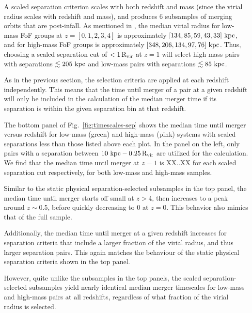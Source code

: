 \documentclass[twocolumn,linenumbers]{aastex631}
\newcommand{\Rvir}{\ensuremath{\rm R_{vir}}}
\newcommand{\chambe}{\citet{Chamberlain2024}}
\begin{document}
A scaled separation criterion scales with both redshift and mass (since the virial radius scales with redshift and mass), and produces 6 subsamples of merging orbits that are post-infall.
As mentioned in \chambe{}, the median virial radius for low-mass FoF groups at $z=[0,1,2,3,4]$ is approximately $[134, 85, 59, 43, 33]\,\mathrm{\,kpc}$, and for high-mass FoF groups is approximately $[348, 206, 134, 97, 76]\,\mathrm{\,kpc}$.
Thus, choosing a scaled separation cut of $<1\,\Rvir$ at $z=1$ will select high-mass pairs with separations $\lesssim205\,\mathrm{\,kpc}$ and low-mass pairs with separations $\lesssim85\,\mathrm{\,kpc}$.

As in the previous section, the selection criteria are applied at each redshift independently. 
This means that the time until merger of a pair at a given redshift will only be included in the calculation of the median merger time if its separation is within the given separation bin at that redshift. 

The bottom panel of Fig.~\ref{fig:timescales-sep} shows the median time until merger versus redshift for low-mass (green) and high-mass (pink) systems with scaled separations less than those listed above each plot. 
In the panel on the left, only pairs with a separation between $10\,\kpc-0.25\,\Rvir$ are utilized for the calculation. 
We find that the median time until merger at $z=1$ is XX..XX for each scaled separation cut respectively, for both low-mass and high-mass samples.

Similar to the static physical separation-selected subsamples in the top panel, the median time until merger starts off small at $z>4$, then increases to a peak around $z\sim0.5$, before quickly decreasing to 0 at $z=0$. 
This behavior also mimics that of the full sample. 

Additionally, the median time until merger at a given redshift increases for separation criteria that include a larger fraction of the virial radius, and thus larger separation pairs. 
This again matches the behaviour of the static physical separation criteria shown in the top panel.

However, quite unlike the subsamples in the top panels, the scaled separation-selected subsamples yield nearly identical median merger timescales for low-mass and high-mass pairs at all redshifts, regardless of what fraction of the virial radius is selected. 


\end{document}
